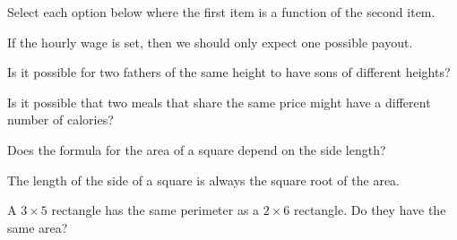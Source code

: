 \documentclass{ximera}
\begin{document}
\begin{question}
Select each option below where the first item is a function of the second item.

    \begin{multipleChoice}
    \end{multipleChoice}
    \begin{hint}
    If the hourly wage is set, then we should only expect one possible payout.
    \end{hint}
    \begin{hint}
    Is it possible for two fathers of the same height to have sons of different heights?
    \end{hint}
    \begin{hint}
    Is it possible that two meals that share the same price might have a different number of calories?
    \end{hint}
    \begin{hint}
    Does the formula for the area of a square depend on the side length?
    \end{hint}
    \begin{hint}
    The length of the side of a square is always the square root of the area.
    \end{hint}
    \begin{hint}
    A $3\times 5$ rectangle has the same perimeter as a $2\times 6$ rectangle. Do they have the same area?
    \end{hint}
\end{question}
\end{document}
